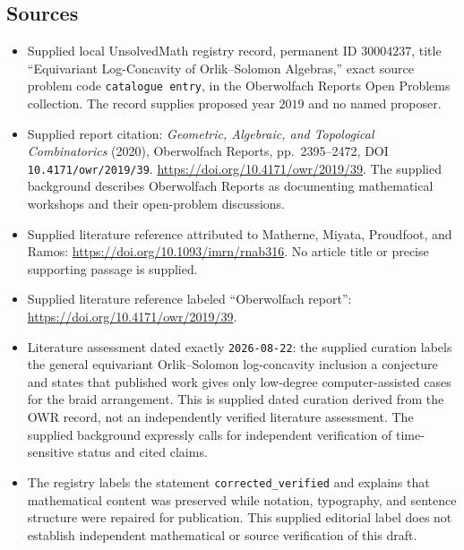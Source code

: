 \documentclass[11pt]{article}
\begin{document}
\subsection{Sources}
\begin{itemize}
\item Supplied local UnsolvedMath registry record, permanent ID \(30004237\), title ``Equivariant Log-Concavity of Orlik--Solomon Algebras,'' exact source problem code \texttt{catalogue entry}, in the Oberwolfach Reports Open Problems collection. The record supplies proposed year \(2019\) and no named proposer.
\item Supplied report citation: \emph{Geometric, Algebraic, and Topological Combinatorics} (2020), Oberwolfach Reports, pp.\ 2395--2472, DOI \texttt{10.4171/owr/2019/39}. \url{https://doi.org/10.4171/owr/2019/39}. The supplied background describes Oberwolfach Reports as documenting mathematical workshops and their open-problem discussions.
\item Supplied literature reference attributed to Matherne, Miyata, Proudfoot, and Ramos: \url{https://doi.org/10.1093/imrn/rnab316}. No article title or precise supporting passage is supplied.
\item Supplied literature reference labeled ``Oberwolfach report'': \url{https://doi.org/10.4171/owr/2019/39}.
\item Literature assessment dated exactly \texttt{2026-08-22}: the supplied curation labels the general equivariant Orlik--Solomon log-concavity inclusion a conjecture and states that published work gives only low-degree computer-assisted cases for the braid arrangement. This is supplied dated curation derived from the OWR record, not an independently verified literature assessment. The supplied background expressly calls for independent verification of time-sensitive status and cited claims.
\item The registry labels the statement \texttt{corrected\_verified} and explains that mathematical content was preserved while notation, typography, and sentence structure were repaired for publication. This supplied editorial label does not establish independent mathematical or source verification of this draft.
\end{itemize}
\end{document}
